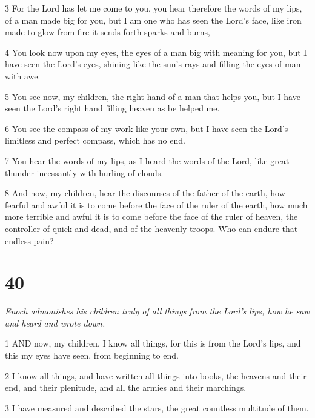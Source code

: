 \par 3 For the Lord has let me come to you, you hear therefore the words of my lips, of a man made big for you, but I am one who has seen the Lord's face, like iron made to glow from fire it sends forth sparks and burns,

\par 4 You look now upon my eyes, the eyes of a man big with meaning for you, but I have seen the Lord's eyes, shining like the sun's rays and filling the eyes of man with awe.

\par 5 You see now, my children, the right hand of a man that helps you, but I have seen the Lord's right hand filling heaven as be helped me.

\par 6 You see the compass of my work like your own, but I have seen the Lord's limitless and perfect compass, which has no end.

\par 7 You hear the words of my lips, as I heard the words of the Lord, like great thunder incessantly with hurling of clouds.

\par 8 And now, my children, hear the discourses of the father of the earth, how fearful and awful it is to come before the face of the ruler of the earth, how much more terrible and awful it is to come before the face of the ruler of heaven, the controller of quick and dead, and of the heavenly troops. Who can endure that endless pain?

\chapter{40}

\par \textit{Enoch admonishes his children truly of all things from the Lord's lips, how he saw and heard and wrote down.}

\par 1 AND now, my children, I know all things, for this is from the Lord's lips, and this my eyes have seen, from beginning to end.

\par 2 I know all things, and have written all things into books, the heavens and their end, and their plenitude, and all the armies and their marchings.

\par 3 I have measured and described the stars, the great countless multitude of them.

